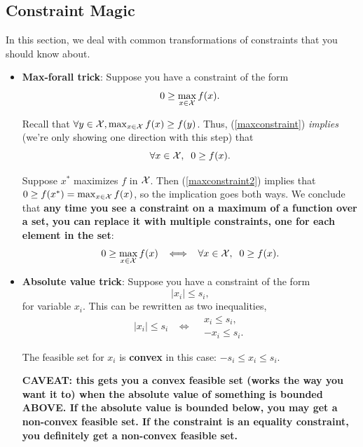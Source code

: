 \documentclass[12pt]{article}
\begin{document}
\subsection{Constraint Magic}

In this section, we deal with common transformations of constraints that you should know about. 

\begin{itemize}
\item \textbf{Max-forall trick}: Suppose you have a constraint of the form
%
\begin{equation}
0 \geq \max_{x \in {\mathcal X}} f(x). \label{maxconstraint}
\end{equation}

Recall that $\forall y \in {\mathcal X}, \max_{x \in {\mathcal X}} f(x) \geq f(y)$. Thus, (\ref{maxconstraint}) \textit{implies} (we're only showing one direction with this step) that
%
\begin{equation}
\forall x \in {\mathcal X}, \;\; 0 \geq f(x). \label{maxconstraint2}
\end{equation}

Suppose $x^*$ maximizes $f$ in ${\mathcal X}$. Then (\ref{maxconstraint2}) implies that $0 \geq f(x^*) = \max_{x \in {\mathcal X}} f(x)$, so the implication goes both ways. We conclude that \textbf{any time you see a constraint on a maximum of a function over a set, you can replace it with multiple constraints, one for each element in the set}:
%
\begin{equation*}
0 \geq \max_{x \in {\mathcal X}} f(x) \;\;\; \Longleftrightarrow \;\;\; \forall x \in {\mathcal X}, \;\; 0 \geq f(x).
\end{equation*}

\item \textbf{Absolute value trick}: Suppose you have a constraint of the form
%
\begin{equation*}
|x_i| \leq s_i,
\end{equation*}
% 
for variable $x_i$. This can be rewritten as two inequalities,
%
\begin{equation*}
|x_i| \leq s_i \;\;\; \Longleftrightarrow \;\;\; \begin{array}{c}
x_i \leq s_i, \\
-x_i \leq s_i.
\end{array}
\end{equation*}

The feasible set for $x_i$ is \textbf{convex} in this case: $-s_i \leq x_i \leq s_i$. 

\textbf{CAVEAT: this gets you a convex feasible set (works the way you want it to) when the absolute value of something is bounded ABOVE. If the absolute value is bounded below, you may get a non-convex feasible set. If the constraint is an equality constraint, you definitely get a non-convex feasible set.}


\end{itemize}
\end{document}
